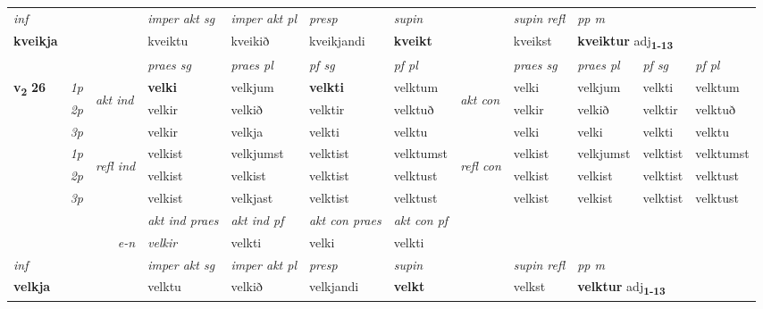 \begin{longtable}[l]{X>{\footnotesize\itshape}llXXXXlXXXX}
   {\textit{inf}} & &  & \textit{imper akt sg} & \textit{imper akt pl}   & \textit{presp} & \textit{supin} && \textit{supin refl} & \textit{pp m} \\*
  {\textbf{kveikja}} & && kveiktu  & kveikið   & kveikjandi &  \textbf{kveikt} && kveikst & \multicolumn{2}{l}{\textbf{kveiktur} adj\textbf{\textsubscript{1-13}}} \\*

\midrule

 & &   & \textit{praes sg}  & \textit{praes pl}    & \textit{ pf sg} & \textit{pf pl} & & \textit{praes sg}  & \textit{praes pl}    & \textit{pf sg} & \textit{pf pl }  \\ \cmidrule{4-7} \cmidrule{9-12}
 \multirow{2}{*}{{{\textbf{v{\textsubscript{2}}} \Large{\textbf{26}}}}}  & 1p & \multirow{3}{*}{\begin{turn}{90}\textit{akt ind}\end{turn}} & \textbf{velki} & velkjum & \textbf{velkti} & velktum & \multirow{3}{*}{\begin{turn}{90}\textit{akt con}\end{turn}} &velki & velkjum & velkti & velktum\\*
 & 2p &  &  velkir  & velkið & velktir & velktuð & & velkir & velkið & velktir & velktuð \\*
 & 3p &  & velkir & velkja & velkti & velktu & & velki & velki& velkti & velktu \\*
\cmidrule{4-7} \cmidrule{9-12}
 & 1p & \multirow{3}{*}{\begin{turn}{90}\textit{refl ind}\end{turn}}  & velkist & velkjumst & velktist & velktumst & \multirow{3}{*}{\begin{turn}{90}\textit{refl con}\end{turn}}  &velkist & velkjumst & velktist & velktumst \\*
 & 2p &  & velkist & velkist & velktist & velktust & &velkist & velkist & velktist & velktust \\*
 & 3p  & & velkist & velkjast & velktist & velktust & & velkist & velkist& velktist & velktust \\*
\cmidrule{4-7} \cmidrule{9-12}

   && &  \textit{akt ind praes} & \textit{akt ind pf} & \textit{akt con praes} & \textit{akt con pf} \\*
\multicolumn{3}{r}{\textit{e-n}} & velkir & velkti & velki & velkti \\*

\cmidrule{4-7}
   {\textit{inf}} & &  & \textit{imper akt sg} & \textit{imper akt pl}   & \textit{presp} & \textit{supin} && \textit{supin refl} & \textit{pp m} \\*
  {\textbf{velkja}} & && velktu  & velkið   & velkjandi &  \textbf{velkt} && velkst & \multicolumn{2}{l}{\textbf{velktur} adj\textbf{\textsubscript{1-13}}} \\*


\end{longtable}
